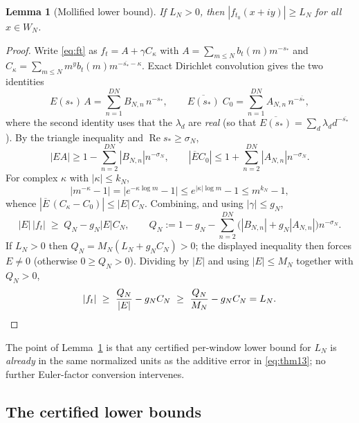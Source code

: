 \documentclass[11pt]{article}
\newtheorem{lemma}[theorem]{Lemma}
\theoremstyle{definition}
\DeclareMathOperator{\Rea}{Re}
\begin{document}
\begin{lemma}[Mollified lower bound]\label{lem:native}
If $L_N>0$, then $|f_{t_0}(x+iy)|\ge L_N$ for all $x\in W_N$.
\end{lemma}

\begin{proof}
Write \eqref{eq:ft} as $f_t=A+\gamma C_\kappa$ with
$A=\sum_{m\le N}b_t(m)m^{-s_*}$ and
$C_\kappa=\sum_{m\le N}m^yb_t(m)m^{-\overline{s_*}-\kappa}$. Exact
Dirichlet convolution gives the two identities
\begin{equation}\label{eq:conv}
E(s_*)\,A=\sum_{n=1}^{DN}B_{N,n}\,n^{-s_*},
\qquad
\overline{E(s_*)}\;C_0=\sum_{n=1}^{DN}A_{N,n}\,n^{-\overline{s_*}} ,
\end{equation}
where the second identity uses that the $\lambda_d$ are \emph{real}
(so that $\overline{E(s_*)}=\sum_d\lambda_d d^{-\overline{s_*}}$).
By the triangle inequality and $\Rea s_*\ge\sigma_N$,
\[
|EA|\ge1-\sum_{n=2}^{DN}|B_{N,n}|n^{-\sigma_N},
\qquad
|\overline EC_0|\le1+\sum_{n=2}^{DN}|A_{N,n}|n^{-\sigma_N}.
\]
For complex $\kappa$ with $|\kappa|\le k_N$,
\begin{equation}\label{eq:kappaest}
|m^{-\kappa}-1|=\bigl|e^{-\kappa\log m}-1\bigr|
\le e^{|\kappa|\log m}-1\le m^{k_N}-1,
\end{equation}
whence $|\overline E\,(C_\kappa-C_0)|\le|E|\,C_N$. Combining, and
using $|\gamma|\le g_N$,
\[
|E|\,|f_t|\;\ge\;Q_N-g_N|E|C_N,
\qquad
Q_N:=1-g_N-\sum_{n=2}^{DN}\bigl(|B_{N,n}|+g_N|A_{N,n}|\bigr)n^{-\sigma_N}.
\]
If $L_N>0$ then $Q_N=M_N(L_N+g_NC_N)>0$; the displayed inequality then
forces $E\ne0$ (otherwise $0\ge Q_N>0$). Dividing by $|E|$ and using
$|E|\le M_N$ together with $Q_N>0$,
\[
|f_t|\ \ge\ \frac{Q_N}{|E|}-g_NC_N
\ \ge\ \frac{Q_N}{M_N}-g_NC_N=L_N. \qedhere
\]
\end{proof}

The point of Lemma~\ref{lem:native} is that any certified
per-window lower bound for $L_N$ is \emph{already} in the same
normalized units as the additive error in \eqref{eq:thm13}; no
further Euler-factor conversion intervenes.

\subsection{The certified lower bounds}\label{sec:stored}
\end{document}
